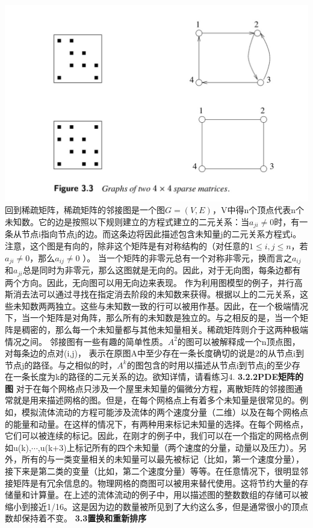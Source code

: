 \documentclass{article}
\begin{document}
\includegraphics[scale=0.25]{3_3.png}
\newline\newline
回到稀疏矩阵，稀疏矩阵的邻接图是一个图$G=(V,E)$，V中得n个顶点代表n个未知数。它的边是按照以下规则建立的方程式建立的二元关系：当$a_{ji}\neq0$时，有一条从节点i指向节点j的边。而这条边将因此描述包含未知量j的二元关系方程式i。注意，这个图是有向的，除非这个矩阵是有对称结构的（对任意的$1\leq i,j\leq n$，若$a_{ji}\neq 0$，那么$a_{ij}\neq 0$ ）。
\newline
当一个矩阵的非零元总有一个对称非零元，换而言之$a_{ij}$和$a_{ji}$总是同时为非零元，那么这图就是无向的。因此，对于无向图，每条边都有两个方向。因此，无向图可以用无向边来表现。
\newline
作为利用图模型的例子，并行高斯消去法可以通过寻找在指定消去阶段的未知数来获得。根据以上的二元关系，这些未知数两两独立。这些与未知数一致的行可以被用作基。因此，在一个极端情况下，当一个矩阵是对角阵，那么所有的未知数是独立的。与之相反的是，当一个矩阵是稠密的，那么每一个未知量都与其他未知量相关。稀疏矩阵则介于这两种极端情况之间。
\newline
邻接图有一些有趣的简单性质。$A^2$的图可以被解释成一个n顶点图，对每条边的点对(i,j)， 表示在原图A中至少存在一条长度确切的说是2的从节点i到节点j的路径。与之相似的时，$A^k$的图包含的时用以描述从节点i到节点j的至少存在一条长度为k的路径的二元关系的边。欲知详情，请看练习4.
\newline
\textbf{3.2.2PDE矩阵的图}
\newline
对于在每个网格点只涉及一个屋里未知量的偏微分方程，离散矩阵的邻接图通常就是用来描述网格的图。但是，在每个网格点上有着多个未知量是很常见的。例如，模拟流体流动的方程可能涉及流体的两个速度分量（二维）以及在每个网格点的能量和动量。在这样的情况下，有两种用来标记未知量的选择。在每个网格点，它们可以被连续的标记。因此，在刚才的例子中，我们可以在一个指定的网格点例如u(k),$\cdots$,u(k+3)上标记所有的四个未知量（两个速度的分量，动量以及压力）。另外，所有的与一类变量相关的未知量可以最先被标记（比如，第一个速度分量），接下来是第二类的变量（比如，第二个速度分量）等等。在任意情况下，很明显邻接矩阵是有冗余信息的。物理网格的商图可以被用来替代使用。这将节约大量的存储量和计算量。在上述的流体流动的例子中，用以描述图的整数数组的存储可以被缩小到接近1/16。这是因为边的数量被所见到了大约这么多，但是通常很小的顶点数却保持着不变。
\newline
\textbf{3.3置换和重新排序}
\newline
\end{document}
